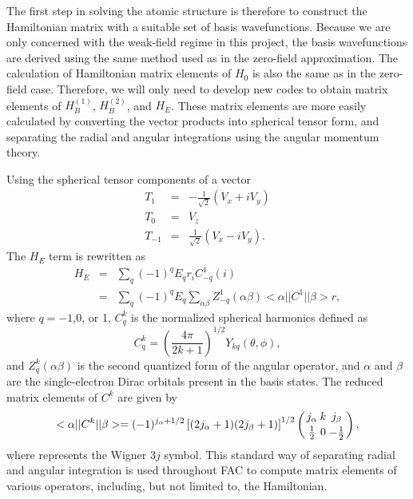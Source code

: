 The first step in solving the atomic structure is therefore to construct the
Hamiltonian matrix with a suitable set of basis wavefunctions. Because we are
only concerned with the weak-field regime in this project, the basis
wavefunctions are derived using the same method used as in the zero-field
approximation. The calculation of Hamiltonian matrix elements of $H_0$ is also
the same as in the zero-field case. Therefore, we will only need to develop new
codes to obtain matrix elements of $H_B^{(1)}$, $H_B^{(2)}$, and $H_E$. These
matrix elements are more easily calculated by converting the vector products
into spherical tensor form, and separating the radial and angular integrations
using the angular momentum theory.

Using the spherical tensor components of a vector
\begin{eqnarray}
T_1 &=& -\frac{1}{\sqrt{2}}\left(V_x+iV_y\right) \nonumber\\
T_0 &=& V_z \nonumber\\
T_{-1} &=& \frac{1}{\sqrt{2}}\left(V_x-iV_y\right).
\end{eqnarray}
The $H_E$ term is rewritten as
\begin{eqnarray}
\label{eq:he}
H_E &=& \sum_q (-1)^q E_q r_iC^1_{-q}(i) \nonumber\\
     &=& \sum_q (-1)^q E_q \sum_{\alpha\beta}
     Z^1_{-q}(\alpha\beta)<\alpha||C^1||\beta>r,
\end{eqnarray}
where $q=-1$,0, or 1, $C^k_q$ is the normalized spherical harmonics defined as
\begin{equation}
C^k_q = \left(\frac{4\pi}{2k+1}\right)^{1/2}Y_{kq}(\theta,\phi),
\end{equation}
and $Z^k_q(\alpha\beta)$ is the second quantized form of the angular
operator, and $\alpha$ and $\beta$ are the single-electron Dirac
orbitals present
in the basis states. The reduced matrix elements of $C^k$ are given by
\begin{equation}
<\alpha||C^k||\beta> =
(-1)^{j_\alpha+1/2}\left[(2j_\alpha+1)(2j_\beta+1)\right]^{1/2}
\threej{j_\alpha}{k}{j_\beta}{\frac{1}{2}}{0}{-\frac{1}{2}},
\end{equation}
where  represents the Wigner $3j$ symbol.
This standard way of separating radial and angular
integration is used throughout FAC to compute matrix elements of
various operators, including, but not limited to, the Hamiltonian.

